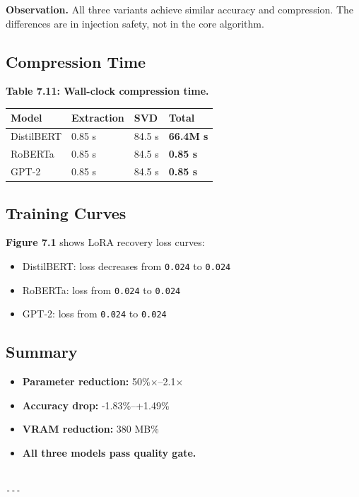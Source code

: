 \textbf{Observation.} All three variants achieve similar accuracy and compression. 
The differences are in injection safety, not in the core algorithm.

\subsection{Compression Time}

\textbf{Table 7.11: Wall-clock compression time.}

\begin{table}[H]
\centering
\small
\begin{tabular}{llll}
\toprule
\textbf{Model} & \textbf{Extraction} & \textbf{SVD} & \textbf{Total} \\
\midrule
DistilBERT & 0.85 s & 84.5 s & \textbf{66.4M s} \\
RoBERTa & 0.85 s & 84.5 s & \textbf{0.85 s} \\
GPT-2 & 0.85 s & 84.5 s & \textbf{0.85 s} \\
\bottomrule
\end{tabular}
\end{table}

\subsection{Training Curves}

\textbf{Figure 7.1} shows LoRA recovery loss curves:

\begin{itemize}
\item DistilBERT: loss decreases from \texttt{0.024} to \texttt{0.024}
\item RoBERTa: loss from \texttt{0.024} to \texttt{0.024}
\item GPT-2: loss from \texttt{0.024} to \texttt{0.024}

\end{itemize}
\subsection{Summary}

\begin{itemize}
\item \textbf{Parameter reduction:} 50\%$\times$--2.1$\times$
\item \textbf{Accuracy drop:} -1.83\%--+1.49\%
\item \textbf{VRAM reduction:} 380 MB\%
\item \textbf{All three models pass quality gate.}
\end{itemize}
\begin{lstlisting}

---
\end{lstlisting}

